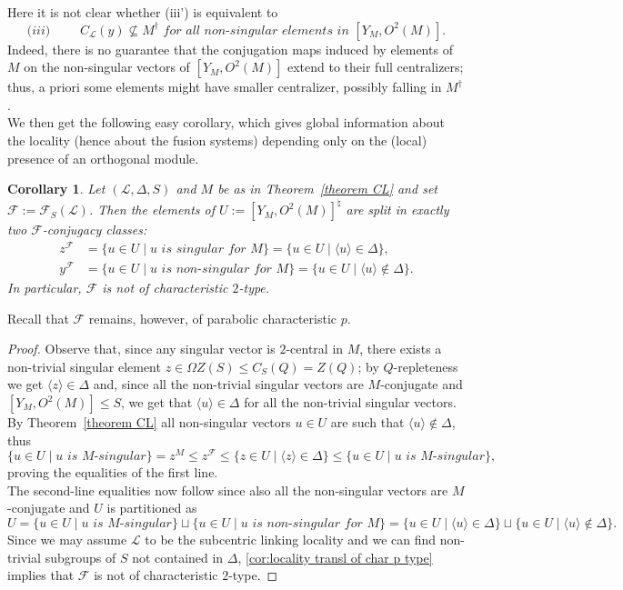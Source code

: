 \documentclass{amsart}
\numberwithin{equation}{section}
\newtheorem{cor}[equation]{Corollary}
\theoremstyle{definition}
\theoremstyle{subresult}
\theoremstyle{caseresult}
\newcommand{\F}{\mathcal{F}}
\renewcommand{\L}{\mathcal{L}}
\newcommand{\<}{\langle}
\renewcommand{\>}{\rangle}
\begin{document}
Here it is not clear whether (iii') is equivalent to 
\[
    \textit{(iii) $\qquad C_\L(y) \not \subseteq M^\dagger$ for all non-singular elements in $[Y_M,O^2(M)].$}
\]
Indeed, there is no guarantee that the conjugation maps induced by elements of $M$ on the non-singular vectors of $[Y_M,O^2(M)]$ extend to their full centralizers; thus, a priori some elements might have smaller centralizer, possibly falling in $M^\dagger$.\\

We then get the following easy corollary, which gives global information about the locality (hence about the fusion systems) depending only on the (local) presence of an orthogonal module.

\begin{cor}\label{corollary to Theorem CL}
    Let $(\L,\Delta,S)$ and $M$ be as in Theorem~\ref{theorem CL} and set $\F:=\F_S(\L)$. Then the elements of $U:=[Y_M,O^2(M)]^\natural$ are split in exactly two $\F$-conjugacy classes:
    \begin{align*}
        z^\F &= \{ u \in U \mid \textit{$u$ is singular for $M$} \} = \{u \in U \mid \<u\> \in \Delta \}, \\
        y^\F &= \{ u \in U \mid  \textit{$u$ is non-singular for $M$} \} = \{u \in U \mid \<u\> \not \in \Delta \}.
    \end{align*}
	In particular, $\F$ is not of characteristic $2$-type.
\end{cor}
Recall that $\F$ remains, however, of parabolic characteristic $p$.
\begin{proof}
Observe that, since any singular vector is $2$-central in $M$, there exists a non-trivial singular element $z \in \Omega Z(S) \le C_S(Q) = Z(Q)$; by $Q$-repleteness we get $\<z\> \in \Delta$ and, since all the non-trivial singular vectors are $M$-conjugate and $[Y_M,O^2(M)] \le S$, we get that $\< u \> \in \Delta$ for all the non-trivial singular vectors. By Theorem~\ref{theorem CL} all non-singular vectors $u \in U$ are such that $\<u\> \not \in \Delta$, thus
\[
\{u \in U \mid \textit{u is $M$-singular} \} = z^M \le z^\F \le \{z \in U \mid \< z \> \in \Delta \} \le \{u \in U \mid \textit{u is $M$-singular} \},
\]
proving the equalities of the first line.\\
The second-line equalities now follow since also all the non-singular vectors are $M$-conjugate and $U$ is partitioned as
\[
    U = \{ u \in U \mid \textit{$u$ is $M$-singular} \} \sqcup \{ u \in U \mid  \textit{$u$ is non-singular for $M$} \} = \{u \in U \mid \<u\> \in \Delta \} \sqcup \{u \in U \mid \<u\> \not \in \Delta \}.
\]
Since we may assume $\L$ to be the subcentric linking locality and we can find non-trivial subgroups of $S$ not contained in $\Delta$, \ref{cor:locality transl of char p type} implies that $\F$ is not of characteristic $2$-type.
\end{proof}
\end{document}
